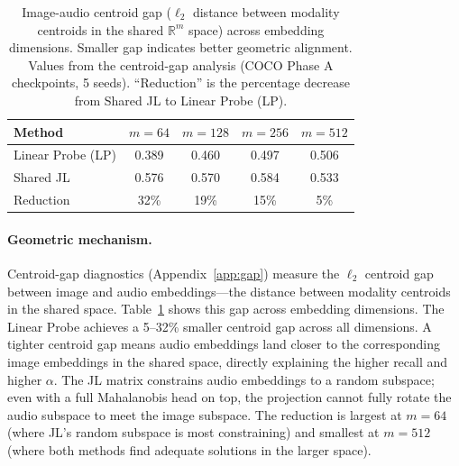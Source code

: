 \documentclass{article}
\begin{document}
\begin{table}[tbp]
  \caption{Image-audio centroid gap ($\ell_2$ distance between modality centroids in the shared
  $\mathbb{R}^m$ space) across embedding dimensions. Smaller gap indicates better geometric alignment.
  Values from the centroid-gap analysis (COCO Phase A checkpoints, 5 seeds).
  ``Reduction'' is the percentage decrease from Shared JL to Linear Probe (LP).}
  \label{tab:centroid_gap_main}
  \centering
  \footnotesize
  \begin{tabular}{lcccc}
  \toprule
  Method & $m=64$ & $m=128$ & $m=256$ & $m=512$ \\
  \midrule
  Linear Probe (LP) & 0.389 & 0.460 & 0.497 & 0.506 \\
  Shared JL         & 0.576 & 0.570 & 0.584 & 0.533 \\
  Reduction         & 32\%  & 19\%  & 15\%  &  5\%  \\
  \bottomrule
  \end{tabular}
\end{table}

\paragraph{Geometric mechanism.}
Centroid-gap diagnostics (Appendix~\ref{app:gap}) measure the $\ell_2$ centroid gap between image and audio embeddings---the distance between modality centroids in the shared space.
Table~\ref{tab:centroid_gap_main} shows this gap across embedding dimensions.
The Linear Probe achieves a 5--32\% smaller centroid gap across all dimensions.
A tighter centroid gap means audio embeddings land closer to the corresponding image embeddings in the shared space, directly explaining the higher recall and higher $\alpha$.
The JL matrix constrains audio embeddings to a random subspace; even with a full Mahalanobis head on top, the projection cannot fully rotate the audio subspace to meet the image subspace.
The reduction is largest at $m=64$ (where JL's random subspace is most constraining) and smallest at $m=512$ (where both methods find adequate solutions in the larger space).
\end{document}

